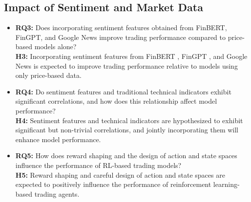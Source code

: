 \documentclass[12pt,a4paper]{report}
\begin{document}
\subsection*{Impact of Sentiment and Market Data}
\begin{itemize}
    \item \textbf{RQ3:} Does incorporating sentiment features obtained from FinBERT, FinGPT, and Google News improve trading performance compared to price-based models alone? \\
    \textbf{H3:} Incorporating sentiment features from FinBERT \cite{araci2019finbert}, FinGPT \cite{yang2023fingpt}, and Google News is expected to improve trading performance relative to models using only price-based data.
    
    \item \textbf{RQ4:} Do sentiment features and traditional technical indicators exhibit significant correlations, and how does this relationship affect model performance? \\
    \textbf{H4:} Sentiment features and technical indicators are hypothesized to exhibit significant but non-trivial correlations, and jointly incorporating them will enhance model performance.
    
    \item \textbf{RQ5:} How does reward shaping and the design of action and state spaces influence the performance of RL-based trading models? \\
    \textbf{H5:} Reward shaping and careful design of action and state spaces are expected to positively influence the performance of reinforcement learning-based trading agents.
\end{itemize}
\end{document}
